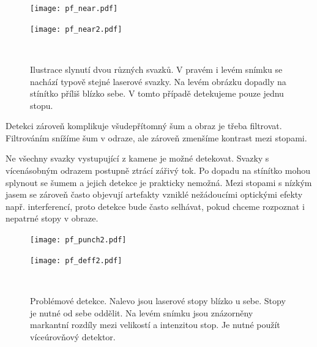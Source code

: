 \begin{figure}[htbp]
    \centering
    \begin{minipage}[c]{0.48\textwidth}
        \centering\texttt{[image: pf\_near.pdf]}
    \end{minipage}
    \begin{minipage}[c]{0.48\textwidth}
        \centering\texttt{[image: pf\_near2.pdf]}
    \end{minipage}
    \\
        \caption[Slynutí dvou různých svazků.]{Ilustrace slynutí dvou různých svazků. V pravém i levém snímku se nachází typově stejné laserové svazky. Na levém obrázku dopadly na stínítko příliš blízko sebe. V tomto případě detekujeme pouze jednu stopu.}
        \label{Splynuti}
\end{figure}

Detekci zároveň komplikuje všudepřítomný šum a obraz je třeba filtrovat. Filtrováním snížíme šum v odraze, ale zároveň zmenšíme kontrast mezi stopami. 

Ne všechny svazky vystupující z kamene je možné detekovat. Svazky s vícenásobným odrazem postupně ztrácí zářivý tok. Po dopadu na stínítko mohou splynout se šumem a jejich detekce je prakticky nemožná. Mezi stopami s nízkým jasem se zároveň často objevují artefakty vzniklé nežádoucími optickými efekty např. interferencí, proto detekce bude často selhávat, pokud chceme rozpoznat i nepatrné stopy v obraze.




\begin{figure}[htbp]
    \centering
    \begin{minipage}[c]{0.48\textwidth}
        \centering\texttt{[image: pf\_punch2.pdf]}
    \end{minipage}
    \begin{minipage}[c]{0.48\textwidth}
        \centering\texttt{[image: pf\_deff2.pdf]}
    \end{minipage}
    \\
        \caption[Problémové detekce.]{Problémové detekce. Nalevo jsou laserové stopy blízko u sebe. Stopy je nutné od sebe oddělit. Na levém snímku jsou znázorněny markantní rozdíly mezi velikostí a intenzitou stop. Je nutné použít víceúrovňový detektor. }
        \label{Detekce}
\end{figure}

